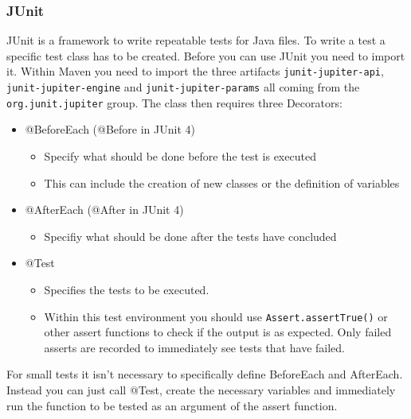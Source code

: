 \documentclass{article}
\begin{document}
 	\subsubsection{JUnit}
 	JUnit is a framework to write repeatable tests for Java files. To write a test a specific test class has to be created. Before you can use JUnit you need to import it. Within Maven you need to import the three artifacts \texttt{junit-jupiter-api}, \texttt{junit-jupiter-engine} and \texttt{junit-jupiter-params} all coming from the \texttt{org.junit.jupiter} group. The class then requires three Decorators:
 	\begin{itemize}
 		\item{@BeforeEach (@Before in JUnit 4)}
 		\begin{itemize}
 			\item{Specify what should be done before the test is executed}
 			\item{This can include the creation of new classes or the definition of variables}
 		\end{itemize}
 		\item{@AfterEach (@After in JUnit 4)}
 		\begin{itemize}
 			\item{Specifiy what should be done after the tests have concluded}
 		\end{itemize}
 		\item{@Test}
 		\begin{itemize}
 			\item{Specifies the tests to be executed.}
 			\item{Within this test environment you should use \texttt{Assert.assertTrue()} or other assert functions to check if the output is as expected. Only failed asserts are recorded to immediately see tests that have failed.}
 		\end{itemize}
 	\end{itemize}
 	For small tests it isn't necessary to specifically define BeforeEach and AfterEach. Instead you can just call @Test, create the necessary variables and immediately run the function to be tested as an argument of the assert function.

























	
\end{document}
